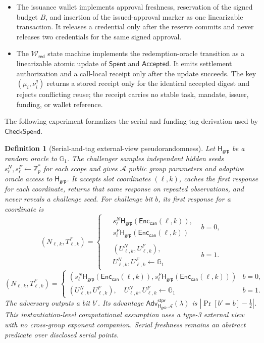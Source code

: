 \documentclass[letterpaper]{article}
\newcommand{\adv}{\mathcal{A}}
\newcommand{\hashG}{\mathsf{H}_{\mathsf{grp}}}
\newcommand{\Adv}{\mathsf{Adv}}
\newtheorem{definition}{Definition}
\begin{document}
\begin{itemize}
  Fiat--Shamir random oracle where algebraic proofs use it. Typed encodings are
  injective.
  \item The issuance wallet implements approval freshness, reservation of the
  signed budget \(B\), and insertion of the issued-approval marker as one
  linearizable transaction. It releases a credential only after the reserve
  commits and never releases two credentials for the same signed approval.
  \item The \(\mathcal{W}_{\mathsf{red}}\) state machine implements the redemption-oracle
  transition as a linearizable atomic update of \(\mathsf{Spent}\) and
  \(\mathsf{Accepted}\). It emits settlement authorization and a call-local
  receipt only after the update succeeds. The key \((\mu_i,\nu_i^q)\) returns a
  stored receipt only for the identical accepted digest and rejects conflicting
  reuse; the receipt carries no stable task, mandate, issuer, funding, or wallet
  reference.
\end{itemize}
The following experiment formalizes the serial and funding-tag derivation used
by \(\mathsf{CheckSpend}\).

\begin{definition}[Serial-and-tag external-view pseudorandomness]
\label{def:serial-tag-pr}
Let \(\hashG\) be a random oracle to \(\mathbb G_1\). The challenger samples
independent hidden seeds \(s^N_\ell,s^F_\ell\leftarrow\mathbb Z_p^*\) for each
scope and gives \(\adv\) public group parameters and adaptive oracle access to
\(\hashG\). It accepts slot coordinates \((\ell,k)\), caches the first response
for each coordinate, returns that same response on repeated observations, and
never reveals a challenge seed. For challenge bit \(b\), its first response for
a coordinate is
\ifdefined\MMAAAITwoColumn
\[
 (N_{\ell,k},T^F_{\ell,k})=
 \begin{cases}
 \begin{aligned}
 &s^N_\ell\hashG(\mathsf{Enc}_{\mathsf{can}}(\ell,k)),\\[-1pt]
 &s^F_\ell\hashG(\mathsf{Enc}_{\mathsf{can}}(\ell,k))
 \end{aligned} & b=0,\\
 \begin{aligned}
 &(U^N_{\ell,k},U^F_{\ell,k}),\\[-1pt]
 &U^N_{\ell,k},U^F_{\ell,k}\leftarrow\mathbb G_1
 \end{aligned} & b=1.
 \end{cases}
\]
\else
\[
 (N_{\ell,k},T^F_{\ell,k})=
 \begin{cases}
 (s^N_\ell\hashG(\mathsf{Enc}_{\mathsf{can}}(\ell,k)),
  s^F_\ell\hashG(\mathsf{Enc}_{\mathsf{can}}(\ell,k))) & b=0,\\
 (U^N_{\ell,k},U^F_{\ell,k}),\quad U^N_{\ell,k},U^F_{\ell,k}\leftarrow\mathbb G_1 & b=1.
 \end{cases}
\]
\fi
The adversary outputs a bit \(b'\). Its advantage
\(\Adv^{\mathsf{stpr}}_{\hashG,\adv}(\lambda)\) is
\(\left|\Pr[b'=b]-\tfrac12\right|\). This
instantiation-level computational assumption uses a type-3 external view with
no cross-group exponent companion. Serial freshness remains an abstract
predicate over disclosed serial points.
\end{definition}
\end{document}
